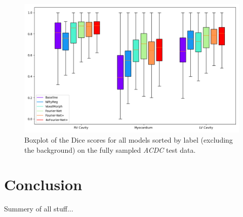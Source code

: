 \documentclass[english,version-2022-01]{uzl-thesis} %
\begin{document}
\begin{figure}[h] %
	\centering
	\graphicspath{{images/}{\main/images/}}
	\includegraphics[width=\linewidth]{Boxplot_DiceScores_FullySampled.png} 
	\caption{Boxplot of the Dice scores for all models sorted by label (excluding the background) on the fully sampled \emph{ACDC} test data.}
	\label{fig:Boxplot_DiceScores}
\end{figure}



\chapter{Conclusion} \label{Ch:Conclusion}
Summery of all stuff...
\end{document}

